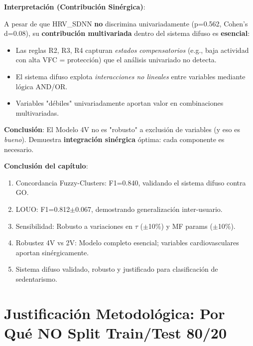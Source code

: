 \documentclass[12pt,letterpaper,twoside]{report}
\begin{document}
\begin{calculobox}
\begin{decisionbox}
\textbf{Interpretación (Contribución Sinérgica)}:

A pesar de que HRV\_SDNN \textbf{no} discrimina univariadamente (p=0.562, Cohen's d=0.08), su \textbf{contribución multivariada} dentro del sistema difuso es \textbf{esencial}:

\begin{itemize}[noitemsep]
    \item Las reglas R2, R3, R4 capturan \textit{estados compensatorios} (e.g., baja actividad con alta VFC = protección) que el análisis univariado no detecta.
    \item El sistema difuso explota \textit{interacciones no lineales} entre variables mediante lógica AND/OR.
    \item Variables "débiles" univariadamente aportan valor en combinaciones multivariadas.
\end{itemize}

\textbf{Conclusión}: El Modelo 4V no es "robusto" a exclusión de variables (y eso es \textit{bueno}). Demuestra \textbf{integración sinérgica} óptima: cada componente es necesario.
\end{decisionbox}

\begin{conclusionbox}
\textbf{Conclusión del capítulo}:

\begin{enumerate}[noitemsep]
    \item Concordancia Fuzzy-Clusters: F1=0.840, validando el sistema difuso contra GO.
    \item LOUO: F1=0.812$\pm$0.067, demostrando generalización inter-usuario.
    \item Sensibilidad: Robusto a variaciones en $\tau$ ($\pm$10\%) y MF params ($\pm$10\%).
    \item Robustez 4V vs 2V: Modelo completo esencial; variables cardiovasculares aportan sinérgicamente.
    \item Sistema difuso validado, robusto y justificado para clasificación de sedentarismo.
\end{enumerate}
\end{conclusionbox}

\chapter{Justificación Metodológica: Por Qué NO Split Train/Test 80/20}


\end{calculobox}
\end{document}
